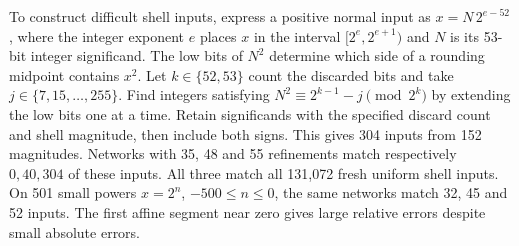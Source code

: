 To construct difficult shell inputs, express a positive normal input as \(x=N\,2^{e-52}\), where the integer exponent \(e\) places \(x\) in the interval \([2^e,2^{e+1})\) and \(N\) is its 53-bit integer significand. The low bits of \(N^2\) determine which side of a rounding midpoint contains \(x^2\). Let \(k\in\{52,53\}\) count the discarded bits and take \(j\in\{7,15,\ldots,255\}\). Find integers satisfying \(N^2\equiv2^{k-1}-j\pmod{2^k}\) by extending the low bits one at a time. Retain significands with the specified discard count and shell magnitude, then include both signs. This gives 304 inputs from 152 magnitudes. Networks with 35, 48 and 55 refinements match respectively \(0,40,304\) of these inputs. All three match all 131,072 fresh uniform shell inputs. On 501 small powers \(x=2^n\), \(-500\le n\le0\), the same networks match 32, 45 and 52 inputs. The first affine segment near zero gives large relative errors despite small absolute errors.
